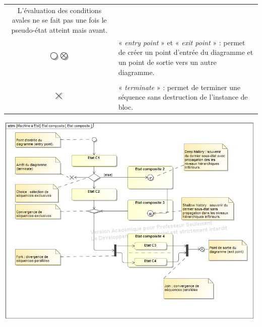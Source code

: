 \documentclass[10pt]{article}
\begin{document}
\begin{defi}
\begin{tabular}[c]{c p{15cm}}
L’évaluation des conditions avales ne se fait pas une fois le pseudo-état atteint mais
avant.\\
\includegraphics[width=.5cm]{images/entry}
\includegraphics[width=.5cm]{images/exit}
& 
« \textit{entry point} » et « \textit{exit point} » : permet de créer un point d’entrée du diagramme et un point de sortie vers un autre diagramme. \\
& \\
\includegraphics[width=.5cm]{images/terminate}
&
« \textit{terminate} » : permet de terminer une séquence sans destruction de l’instance de bloc.
\end{tabular}
\end{defi}

\begin{center}
\includegraphics[width=.8\textwidth]{images/PseudosEtats}
\end{center}




\begin{thebibliography}{2}
\end{thebibliography}
\end{document}
